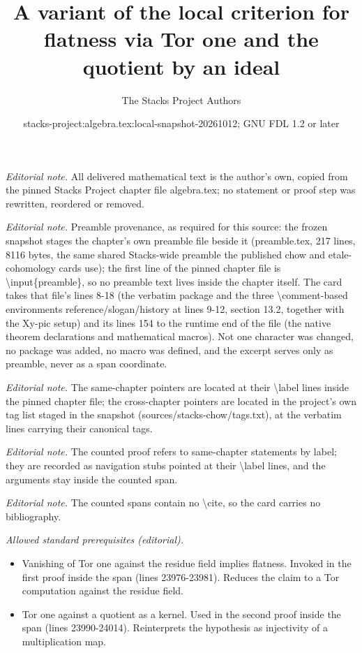 \documentclass[10pt,a4paper]{amsart}
\title{A variant of the local criterion for flatness via Tor one and the quotient by an ideal}
\author{The Stacks Project Authors}
\date{stacks-project:algebra.tex:local-snapshot-20261012; GNU FDL 1.2 or later}
\theoremstyle{plain}
\theoremstyle{definition}
\theoremstyle{remark}
\numberwithin{equation}{subsection}
\begin{document}
\maketitle
\noindent\textit{Editorial note.} All delivered mathematical text is the author's own, copied from the pinned Stacks Project chapter file algebra.tex; no statement or proof step was rewritten, reordered or removed.\par\medskip
\noindent\textit{Editorial note.} Preamble provenance, as required for this source: the frozen snapshot stages the chapter's own preamble file beside it (preamble.tex, 217 lines, 8116 bytes, the same shared Stacks-wide preamble the published chow and etale-cohomology cards use); the first line of the pinned chapter file is \textbackslash{}input\{preamble\}, so no preamble text lives inside the chapter itself. The card takes that file's lines 8-18 (the verbatim package and the three \textbackslash{}comment-based environments reference/slogan/history at lines 9-12, section 13.2, together with the Xy-pic setup) and its lines 154 to the runtime end of the file (the native theorem declarations and mathematical macros). Not one character was changed, no package was added, no macro was defined, and the excerpt serves only as preamble, never as a span coordinate.\par\medskip
\noindent\textit{Editorial note.} The same-chapter pointers are located at their \textbackslash{}label lines inside the pinned chapter file; the cross-chapter pointers are located in the project's own tag list staged in the snapshot (sources/stacks-chow/tags.txt), at the verbatim lines carrying their canonical tags.\par\medskip
\noindent\textit{Editorial note.} The counted proof refers to same-chapter statements by label; they are recorded as navigation stubs pointed at their \textbackslash{}label lines, and the arguments stay inside the counted span.\par\medskip
\noindent\textit{Editorial note.} The counted spans contain no \textbackslash{}cite, so the card carries no bibliography.\par\medskip
\noindent\textit{Allowed standard prerequisites (editorial).}\begin{itemize}
\item Vanishing of Tor one against the residue field implies flatness. Invoked in the first proof inside the span (lines 23976-23981). Reduces the claim to a Tor computation against the residue field.
\item Tor one against a quotient as a kernel. Used in the second proof inside the span (lines 23990-24014). Reinterprets the hypothesis as injectivity of a multiplication map.
\end{itemize}\medskip
\end{document}
